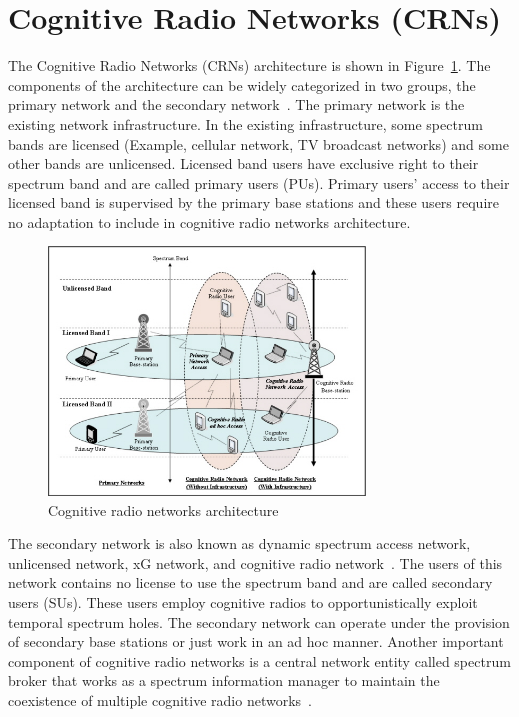 \section{Cognitive Radio Networks (CRNs)}

The Cognitive Radio Networks (CRNs) architecture is shown in Figure~\ref{fig:cogArch}. The components of the architecture can be widely categorized in two groups, the primary network and the secondary network~\cite{akyildiz2006next}. The primary network is the existing network infrastructure. In the existing infrastructure, some spectrum bands are licensed (Example, cellular network, TV broadcast networks) and some other bands are unlicensed. Licensed band users have exclusive right to their spectrum band and are called primary users (PUs). Primary users' access to their licensed band is supervised by the primary base stations and these users require no adaptation to include in cognitive radio networks architecture. 

\begin{figure}[!htbp]
    \begin{center}
        \includegraphics[width=0.75\textwidth]{myFigures/cogarchSir.jpg}
        \caption{Cognitive radio networks architecture~\cite{bwnGatechProjectDescription}}
        \label{fig:cogArch}
    \end{center}
\end{figure}

The secondary network is also known as dynamic spectrum access network, unlicensed network, xG network, and cognitive radio network~\cite{akyildiz2006next}. The users of this network contains no license to use the spectrum band and are called secondary users (SUs). These users employ cognitive radios to opportunistically exploit temporal spectrum holes. The secondary network can operate under the provision of secondary base stations or just work in an ad hoc manner. Another important component of cognitive radio networks is a central network entity called spectrum broker that works as a spectrum information manager to maintain the coexistence of multiple cognitive radio networks~\cite{akyildiz2006next, buddhikot2005dimsumnet, ileri2005demand, zekavat2005user}.

